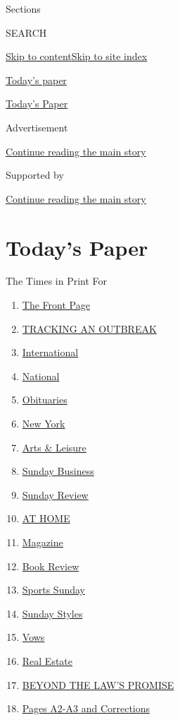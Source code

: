 Sections

SEARCH

\protect\hyperlink{site-content}{Skip to
content}\protect\hyperlink{site-index}{Skip to site index}

\href{https://www.nytimes3xbfgragh.onion/section/todayspaper}{Today's
paper}

\href{https://myaccount.nytimes3xbfgragh.onion/auth/login?response_type=cookie\&client_id=vi}{}

\href{https://www.nytimes3xbfgragh.onion/section/todayspaper}{Today's
Paper}

Advertisement

\protect\hyperlink{after-top}{Continue reading the main story}

Supported by

\protect\hyperlink{after-sponsor}{Continue reading the main story}

\hypertarget{todays-paper}{%
\section{Today's Paper}\label{todays-paper}}

The Times in Print For

\begin{enumerate}
\def\labelenumi{\arabic{enumi}.}
\tightlist
\item
  \protect\hyperlink{thefrontpage}{The Front Page}
\item
  \protect\hyperlink{trackinganoutbreak}{TRACKING AN OUTBREAK}
\item
  \protect\hyperlink{international}{International}
\item
  \protect\hyperlink{national}{National}
\item
  \protect\hyperlink{obituaries}{Obituaries}
\item
  \protect\hyperlink{newyork}{New York}
\item
  \protect\hyperlink{artsux5cux26leisure}{Arts \& Leisure}
\item
  \protect\hyperlink{sundaybusiness}{Sunday Business}
\item
  \protect\hyperlink{sundayreview}{Sunday Review}
\item
  \protect\hyperlink{athome}{AT HOME}
\item
  \protect\hyperlink{magazine}{Magazine}
\item
  \protect\hyperlink{bookreview}{Book Review}
\item
  \protect\hyperlink{sportssunday}{Sports Sunday}
\item
  \protect\hyperlink{sundaystyles}{Sunday Styles}
\item
  \protect\hyperlink{vows}{Vows}
\item
  \protect\hyperlink{realestate}{Real Estate}
\item
  \protect\hyperlink{beyondthelawux27spromise}{BEYOND THE LAW'S PROMISE}
\item
  \protect\hyperlink{pagesa2-a3andcorrections}{Pages A2-A3 and
  Corrections}
\end{enumerate}

